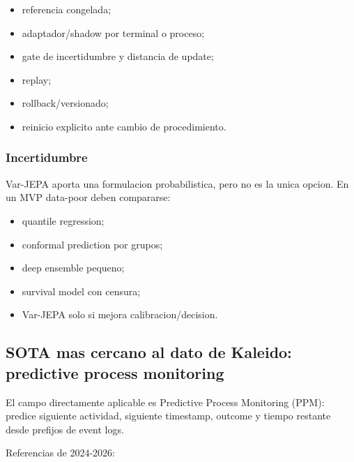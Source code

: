 \documentclass[
  spanish,
  10pt,
  a4paper,
]{article}
\providecommand{\tightlist}{%
  \setlength{\itemsep}{0pt}\setlength{\parskip}{0pt}}
\begin{document}
\begin{itemize}
\tightlist
\item
  referencia congelada;
\item
  adaptador/shadow por terminal o proceso;
\item
  gate de incertidumbre y distancia de update;
\item
  replay;
\item
  rollback/versionado;
\item
  reinicio explicito ante cambio de procedimiento.
\end{itemize}

\subsubsection{Incertidumbre}\label{incertidumbre}

Var-JEPA aporta una formulacion probabilistica, pero no es la unica
opcion. En un MVP data-poor deben compararse:

\begin{itemize}
\tightlist
\item
  quantile regression;
\item
  conformal prediction por grupos;
\item
  deep ensemble pequeno;
\item
  survival model con censura;
\item
  Var-JEPA solo si mejora calibracion/decision.
\end{itemize}

\subsection{SOTA mas cercano al dato de Kaleido: predictive process
monitoring}\label{sota-mas-cercano-al-dato-de-kaleido-predictive-process-monitoring}

El campo directamente aplicable es Predictive Process Monitoring (PPM):
predice siguiente actividad, siguiente timestamp, outcome y tiempo
restante desde prefijos de event logs.

Referencias de 2024-2026:
\end{document}
